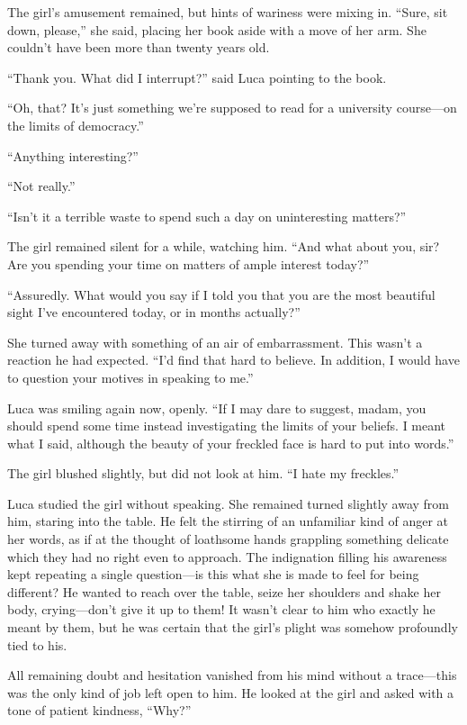 The girl's amusement remained, but hints of wariness were mixing in. ``Sure, sit down, please,'' she said, placing her book aside with a move of her arm. She couldn't have been more than twenty years old.

``Thank you. What did I interrupt?'' said Luca pointing to the book.

``Oh, that? It's just something we're supposed to read for a university course---on the limits of democracy.''

``Anything interesting?''

``Not really.''

``Isn't it a terrible waste to spend such a day on uninteresting matters?''

The girl remained silent for a while, watching him. ``And what about you, sir? Are you spending your time on matters of ample interest today?''

``Assuredly. What would you say if I told you that you are the most beautiful sight I've encountered today, or in months actually?''

She turned away with something of an air of embarrassment. This wasn't a reaction he had expected. ``I'd find that hard to believe. In addition, I would have to question your motives in speaking to me.''

Luca was smiling again now, openly. ``If I may dare to suggest, madam, you should spend some time instead investigating the limits of your beliefs. I meant what I said, although the beauty of your freckled face is hard to put into words.''

The girl blushed slightly, but did not look at him. ``I hate my freckles.''

Luca studied the girl without speaking. She remained turned slightly away from him, staring into the table. He felt the stirring of an unfamiliar kind of anger at her words, as if at the thought of loathsome hands grappling something delicate which they had no right even to approach. The indignation filling his awareness kept repeating a single question---is this what she is made to feel for being different? He wanted to reach over the table, seize her shoulders and shake her body, crying---don't give it up to them! It wasn't clear to him who exactly he meant by them, but he was certain that the girl's plight was somehow profoundly tied to his.

All remaining doubt and hesitation vanished from his mind without a trace---this was the only kind of job left open to him. He looked at the girl and asked with a tone of patient kindness, ``Why?''

